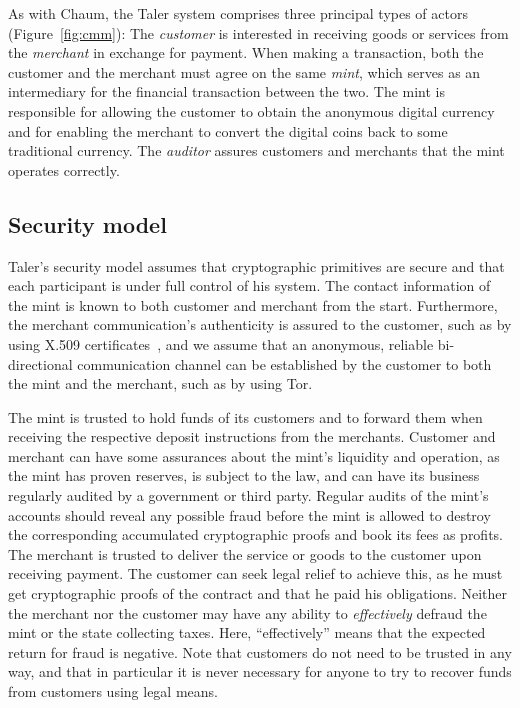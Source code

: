\documentclass{llncs}
\begin{document}
As with Chaum, the Taler system comprises three principal types of
actors (Figure~\ref{fig:cmm}): The \emph{customer} is interested in
receiving goods or services from the \emph{merchant} in exchange for
payment.  When making a transaction, both the customer and the
merchant must agree on the same \emph{mint}, which serves as an
intermediary for the financial transaction between the two.  The mint
is responsible for allowing the customer to obtain the anonymous
digital currency and for enabling the merchant to convert the
digital coins back to some traditional currency.  The \emph{auditor}
assures customers and merchants that the mint operates correctly.

\subsection{Security model}

Taler's security model assumes that cryptographic primitives are
secure and that each participant is under full control of his system.
The contact information of the mint is known to both customer and
merchant from the start.  Furthermore, the merchant communication's
authenticity is assured to the customer, such as by using X.509
certificates~\cite{rfc5280}, and we assume that an anonymous, reliable
bi-directional communication channel can be established by the
customer to both the mint and the merchant, such as by using Tor.

The mint is trusted to hold funds of its customers and to forward them
when receiving the respective deposit instructions from the merchants.
Customer and merchant can have some assurances about the mint's
liquidity and operation, as the mint has proven reserves, is subject
to the law, and can have its business regularly audited
 by a government or third party.
Regular audits of the mint's accounts should reveal any possible fraud
before the mint is allowed to destroy the corresponding accumulated
cryptographic proofs and book its fees as profits.
%
The merchant is trusted to deliver the service or goods to the
customer upon receiving payment.  The customer can seek legal relief
to achieve this, as he must get cryptographic proofs of the contract
and that he paid his obligations.
%
Neither the merchant nor the customer may have any ability to {\em
  effectively} defraud the mint or the state collecting taxes.  Here,
``effectively'' means that the expected return for fraud is negative.
Note that customers do not need to be trusted in any way, and that in
particular it is never necessary for anyone to try to recover funds
from customers using legal means.
\end{document}
